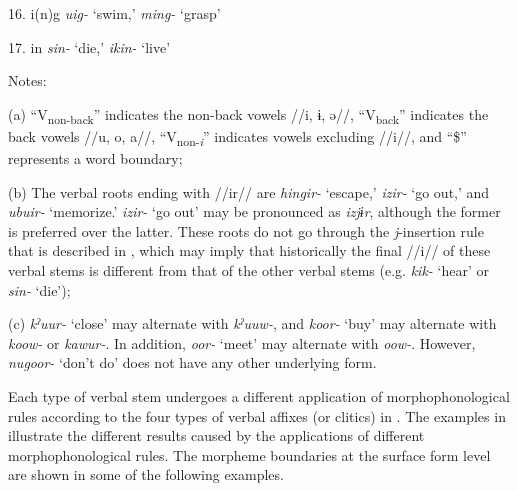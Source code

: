 \begin{table}
16.  i(n)g  \textit{uig-} ‘swim,’ \textit{ming-} ‘grasp’

17.  in  \textit{sin-} ‘die,’ \textit{ikin-} ‘live’

Notes:

(a) “V\textsubscript{non-back}” indicates the non-back vowels //i, ɨ, ə//, “V\textsubscript{back}” indicates the back vowels //u, o, a//, “V\textsubscript{non-}\textit{\textsubscript{i}}” indicates vowels excluding //i//, and “\$” represents a word boundary;

(b) The verbal roots ending with //ir// are \textit{hingir-} ‘escape,’ \textit{izir-} ‘go out,’ and \textit{ubuir-} ‘memorize.’ \textit{izir-} ‘go out’ may be pronounced as \textit{izjɨr}, although the former is preferred over the latter. These roots do not go through the \textit{j}-insertion rule that is described in , which may imply that historically the final //i// of these verbal stems is different from that of the other verbal stems (e.g. \textit{kik-} ‘hear’ or \textit{sin-} ‘die’);

(c) \textit{kˀuur-} ‘close’ may alternate with \textit{kˀuuw-}, and \textit{koor-} ‘buy’ may alternate with \textit{koow-} or \textit{kawur-}. In addition, \textit{oor-} ‘meet’ may alternate with \textit{oow-}. However, \textit{nugoor-} ‘don’t do’ does not have any other underlying form.
\end{table}

Each type of verbal stem undergoes a different application of morphophonological rules according to the four types of verbal affixes (or clitics) in . The examples in  illustrate the different results caused by the applications of different morphophonological rules. The morpheme boundaries at the surface form level are shown in some of the following examples.

